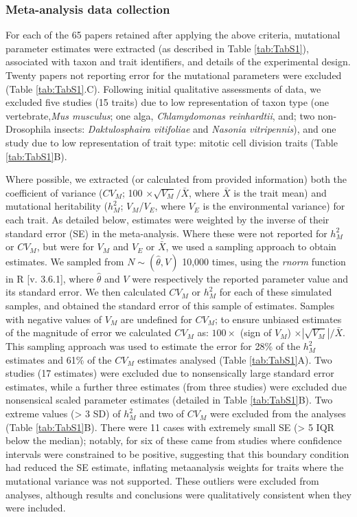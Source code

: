 \subsubsection{Meta-analysis data collection}
For each of the 65 papers retained after applying the above criteria, mutational parameter estimates were extracted (as described in Table \ref{tab:TabS1}), associated with taxon and trait identifiers, and details of the experimental design. Twenty papers not reporting error for the mutational parameters were excluded (Table \ref{tab:TabS1}.C). Following initial qualitative assessments of data, we excluded five studies (15 traits) due to low representation of taxon type (one vertebrate,\textit{Mus musculus}; one alga, \textit{Chlamydomonas reinhardtii}, and; two non-Drosophila insects: \textit{Daktulosphaira vitifoliae} and \textit{Nasonia vitripennis}), and one study due to low representation of trait type: mitotic cell division traits (Table \ref{tab:TabS1}B). \par

Where possible, we extracted (or calculated from provided information) both the coefficient of variance ($CV_M$; 100 $\times \sqrt{V_M}/ \bar{X}$, where $\bar{X}$ is the trait mean) and mutational heritability ($h_M^2$; $V_M$/$V_E$, where $V_E$ is the environmental variance) for each trait. As detailed below, estimates were weighted by the inverse of their standard error (SE) in the meta-analysis. Where these were not reported for $h_M^2$ or $CV_M$, but were for $V_M$ and $V_E$ or $\bar{X}$, we used a sampling approach to obtain estimates. We sampled from $N \sim (\hat\theta, V)$ 10,000 times, using the \textit{rnorm} function in R [v. 3.6.1], where	$\hat\theta$ and $V$ were respectively the reported parameter value and its standard error. We then calculated $CV_M$ or $h_M^2$ for each of these simulated samples, and obtained the standard error of this sample of estimates. Samples with negative values of $V_M$ are undefined for $CV_M$; to ensure unbiased estimates of the magnitude of error we calculated $CV_M$ as: $ 100 \times$ (sign of $V_M$) $\times \left|\sqrt{V_M}\right|/ \bar{X}$. This sampling approach was used to estimate the error for 28\% of the $h_M^2$ estimates and 61\% of the $CV_M$ estimates analysed (Table \ref{tab:TabS1}A). Two studies (17 estimates) were excluded due to nonsensically large standard error estimates, while a further three estimates (from three studies) were excluded due nonsensical scaled parameter estimates (detailed in Table \ref{tab:TabS1}B). Two extreme values (> 3 SD) of $h_M^2$ and two of $CV_M$ were excluded from the analyses (Table \ref{tab:TabS1}B). There were 11 cases with extremely small SE (> 5 IQR below the median); notably, for six of these came from studies where confidence intervals were constrained to be positive, suggesting that this boundary condition had reduced the SE estimate, inflating metaanalysis weights for traits where the mutational variance was not supported. These outliers were excluded from analyses, although results and conclusions were qualitatively consistent when they were included.\par

